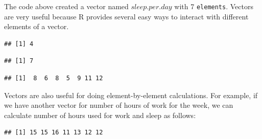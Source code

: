 \documentclass[11pt, letterpaper, twoside]{memoir}\usepackage{knitr}
\begin{document}
The code above created a vector named $sleep.per.day$ with 7 \texttt{elements}. Vectors are very useful because R provides several easy ways to interact with different elements of a vector.

\begin{knitrout}
\color{fgcolor}\begin{kframe}
\begin{alltt}
\hlstd{sleep.per.day[}\hlstd{]} 
\end{alltt}
\begin{verbatim}
## [1] 4
\end{verbatim}
\begin{alltt}
\hlstd{sleep.per.day[}\hlstd{]} \hlkwb{<-}  
 
\end{alltt}
\begin{verbatim}
## [1] 7
\end{verbatim}
\begin{alltt}
 \hlopt{+}  
\end{alltt}
\begin{verbatim}
## [1]  8  6  8  5  9 11 12
\end{verbatim}
\end{kframe}
\end{knitrout}

Vectors are also useful for doing element-by-element calculations. For example, if we have another vector for number of hours of work for the week, we can calculate number of hours used for work and sleep as follows:

\begin{knitrout}
\color{fgcolor}\begin{kframe}
\begin{alltt}
 \hlkwb{<-} \hlstd{(}\hlstd{,} \hlstd{,} \hlstd{,} \hlstd{,} \hlstd{,} \hlstd{,} \hlstd{)} 
 \hlkwb{<-}  \hlopt{+} 
 
\end{alltt}
\begin{verbatim}
## [1] 15 15 16 11 13 12 12
\end{verbatim}
\end{kframe}
\end{knitrout}
\end{document}

